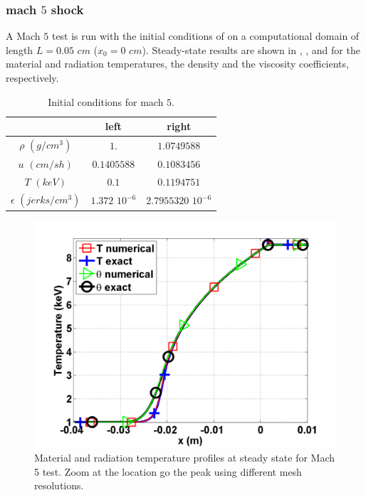 \subsubsection{mach $5$ shock}

A Mach $5$ test is run with the initial conditions of  on a computational domain of length $L=0.05$ $cm$ ($x_0 = 0$ $cm$). Steady-state results are shown in , , and  for the material and radiation temperatures, the density and the viscosity coefficients, respectively.
\begin{table}[H]
\caption{\label{tbl:table6} Initial conditions for mach $5$.}
\begin{center}
\begin{tabular}{|c|c|c|}
\hline 
 & left  & right \\ \hline
$\rho$ $(g/cm^3)$ &$1.$ & $1.0749588$ \\ \hline
$u$ $(cm/sh)$& $0.1405588$ & $0.1083456$ \\ \hline
$T$ $(keV)$& $0.1$ & $0.1194751$\\ \hline
$\epsilon$ $(jerks/cm^3)$ & $1.372$ $10^{-6}$ & $2.7955320$ $10^{-6}$\\
\hline
\end{tabular}  
\end{center}  
\end{table}
\begin{figure}[H]
                \centering
                \includegraphics[width=\textwidth]{figures/Mach_5_nel_1000_temperature.png}
        \caption{Material and radiation temperature profiles at steady state for Mach 5 test. Zoom at the location go the peak using different mesh resolutions.}\label{fig:Mach5_temp}
\end{figure}

